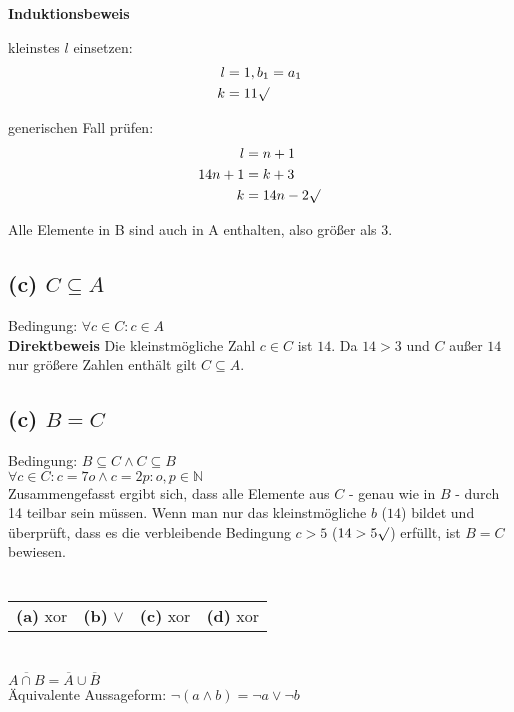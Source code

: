 \documentclass[11pt,a4paper]{article}
\begin{document}
\textbf{Induktionsbeweis}

kleinstes $l$ einsetzen:
\begin{align}
l &= 1, b_{1} = a_{1}\\
k &= 11 \surd
\end{align}

generischen Fall prüfen:
\begin{align}
l &= n+1\\
14n+1 &= k+3\\
k &= 14n-2 \surd
\end{align}

Alle Elemente in B sind auch in A enthalten, also größer als 3.

\subsection[(b)]{(c) $C \subseteq A$}
Bedingung: $\forall c \in C : c \in A$\\

\textbf{Direktbeweis}
Die kleinstmögliche Zahl $c \in C$ ist $14$. Da $14 > 3$ und $C$ außer $14$ nur größere Zahlen enthält gilt $C \subseteq A$.


\subsection[(c)]{(c) $B=C$}
Bedingung: $B \subseteq C \wedge C \subseteq B$\\

$\forall c \in C : c=7o \wedge c=2p : o, p \in \mathbb{N} $\\

Zusammengefasst ergibt sich, dass alle Elemente aus $C$ - genau wie in $B$ - durch 14 teilbar sein müssen. Wenn man nur das kleinstmögliche $b$ ($14$) bildet und überprüft, dass es die verbleibende Bedingung $c > 5$ ($14 > 5\surd$) erfüllt, ist $B=C$ bewiesen.

\section{}

\begin{tabular}{llll}
\textbf{(a)} xor & \textbf{(b)} $\vee$ & \textbf{(c)} xor & \textbf{(d)} xor
\end{tabular}


\section{}
$\overline{A \cap B} = \overline{A} \cup \overline{B}$\\
Äquivalente Aussageform:
$\lnot(a \wedge b) = \lnot a \vee \lnot b$
\end{document}
